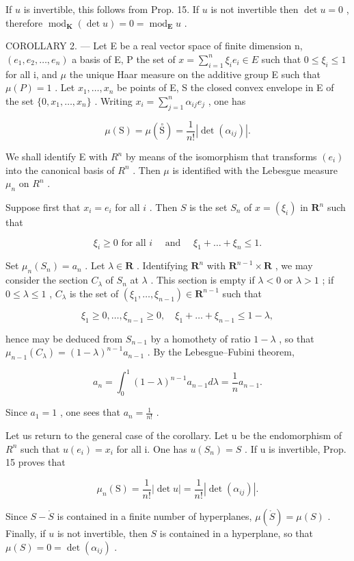 If \(u\) is invertible, this follows from Prop. 15. If \(u\) is not invertible then \(\det u = 0\) , therefore \(\operatorname{mod}_{\mathbf{K}}(\det u) = 0 = \operatorname{mod}_{\mathbf{E}}u\) .

COROLLARY 2. --- Let E be a real vector space of finite dimension n, \((e_{1}, e_{2}, \ldots, e_{n})\) a basis of E, P the set of \(x = \sum_{i=1}^{n} \xi_{i} e_{i} \in E\) such that \(0 \leqslant \xi_{i} \leqslant 1\) for all i, and \(\mu\) the unique Haar measure on the additive group E such that \(\mu(P) = 1\) . Let \(x_{1}, \ldots, x_{n}\) be points of E, S the closed convex envelope in E of the set \(\{0, x_{1}, \ldots, x_{n}\}\) . Writing \(x_{i} = \sum_{j=1}^{n} \alpha_{ij} e_{j}\) , one has

\[
\mu (\mathrm{S}) = \mu (\stackrel {\circ} {\mathrm{S}}) = \frac {1}{n !} | \det (\alpha_ {i j}) |.
\]

We shall identify E with \(R^{n}\) by means of the isomorphism that transforms \((e_{i})\) into the canonical basis of \(R^{n}\) . Then \(\mu\) is identified with the Lebesgue measure \(\mu_{n}\) on \(R^{n}\) .

Suppose first that \(x_{i} = e_{i}\) for all \(i\) . Then \(S\) is the set \(S_{n}\) of \(x = (\xi_{i})\) in \(\mathbf{R}^n\) such that

\[
\xi_ {i} \geqslant 0 \text {   for   all   } i \quad \text { and } \quad \xi_ {1} + \dots + \xi_ {n} \leqslant 1.
\]

Set \(\mu_n(S_n) = a_n\) . Let \(\lambda \in \mathbf{R}\) . Identifying \(\mathbf{R}^n\) with \(\mathbf{R}^{n-1} \times \mathbf{R}\) , we may consider the section \(C_\lambda\) of \(S_n\) at \(\lambda\) . This section is empty if \(\lambda < 0\) or \(\lambda > 1\) ; if \(0 \leqslant \lambda \leqslant 1\) , \(C_\lambda\) is the set of \((\xi_1, \ldots, \xi_{n-1}) \in \mathbf{R}^{n-1}\) such that

\[
\xi_ {1} \geqslant 0, \dots , \xi_ {n - 1} \geqslant 0, \quad \xi_ {1} + \dots + \xi_ {n - 1} \leqslant 1 - \lambda ,
\]

hence may be deduced from \(S_{n-1}\) by a homothety of ratio \(1-\lambda\) , so that \(\mu_{n-1}(C_{\lambda})=(1-\lambda)^{n-1}a_{n-1}\) . By the Lebesgue--Fubini theorem,

\[
a _ {n} = \int_ {0} ^ {1} (1 - \lambda) ^ {n - 1} a _ {n - 1} d \lambda = \frac {1}{n} a _ {n - 1}.
\]

Since \(a_1 = 1\) , one sees that \(a_n = \frac{1}{n!}\) .

Let us return to the general case of the corollary. Let u be the endomorphism of \(R^{n}\) such that \(u(e_{i}) = x_{i}\) for all i. One has \(u(S_{n}) = S\) . If u is invertible, Prop. 15 proves that

\[
\mu_ {n} (\mathrm{S}) = \frac {1}{n !} | \det u | = \frac {1}{n !} | \det (\alpha_ {i j}) |.
\]

Since \(S - \mathring{S}\) is contained in a finite number of hyperplanes, \(\mu(\mathring{S}) = \mu(S)\) . Finally, if \(u\) is not invertible, then \(S\) is contained in a hyperplane, so that \(\mu(S) = 0 = \det(\alpha_{ij})\) .


